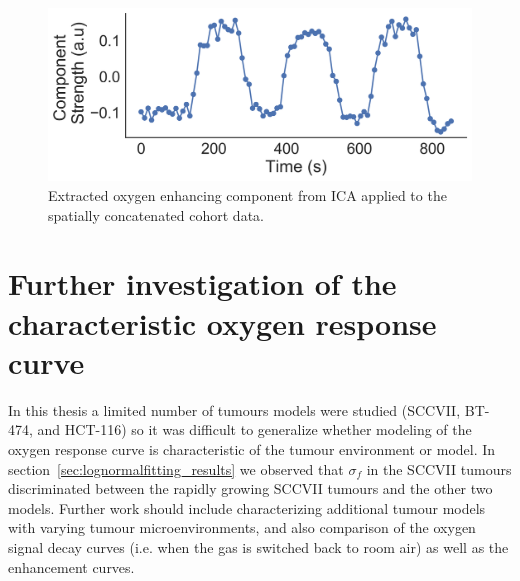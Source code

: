 \begin{figure}[htbp]
   \centering
   \includegraphics[width=\textwidth]{futurework/futurework-images/ISMRM2019_AARTS3_groupICA_OEcomponent.png} %
   \caption{Extracted oxygen enhancing component from \acs{ICA} applied to the spatially concatenated cohort data.
   \label{groupICA1}}
\end{figure}

\section{Further investigation of the characteristic oxygen response curve}

In this thesis a limited number of tumours models were studied (SCCVII, BT-474, and HCT-116) so it was difficult to generalize whether modeling of the oxygen response curve is characteristic of the tumour environment or model. 
In section~\ref{sec:lognormalfitting_results} we observed that $\sigma_f$ in the SCCVII tumours discriminated between the rapidly growing SCCVII tumours and the other two models.
Further work should include characterizing additional tumour models with varying tumour microenvironments, and also comparison of the oxygen signal decay curves (i.e. when the gas is switched back to room air) as well as the enhancement curves.

